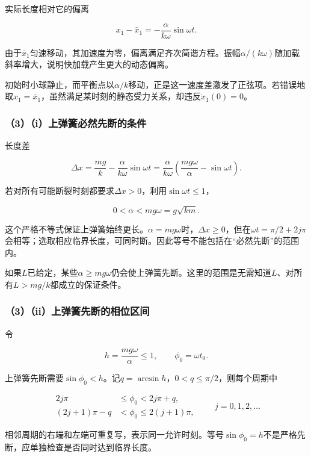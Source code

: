 \documentclass[12pt,a4paper,fontset=fandol]{ctexart}
\begin{document}
实际长度相对它的偏离

\[
x_1-\bar x_1=-\frac{\alpha}{k\omega}\sin\omega t.
\]

由于\(\bar x_1\)匀速移动，其加速度为零，偏离满足齐次简谐方程。振幅\(\alpha/(k\omega)\)随加载斜率增大，说明快加载产生更大的动态偏离。

初始时小球静止，而平衡点以\(\alpha/k\)移动，正是这一速度差激发了正弦项。若错误地取\(x_1=\bar x_1\)，虽然满足某时刻的静态受力关系，却违反\(\dot x_1(0)=0\)。

\subsubsection{（3）（i）上弹簧必然先断的条件}\label{iux4e0aux5f39ux7c27ux5fc5ux7136ux5148ux65adux7684ux6761ux4ef6}

长度差

\[
\Delta x=\frac{mg}k-\frac{\alpha}{k\omega}\sin\omega t
=\frac{\alpha}{k\omega}
\left(\frac{mg\omega}{\alpha}-\sin\omega t\right).
\]

若对所有可能断裂时刻都要求\(\Delta x>0\)，利用\(\sin\omega t\leq1\)，

\[
\boxed{0<\alpha<mg\omega=g\sqrt{km}}.
\]

这个严格不等式保证上弹簧始终更长。\(\alpha=mg\omega\)时，\(\Delta x\geq0\)，但在\(\omega t=\pi/2+2j\pi\)会相等；选取相应临界长度，可同时断。因此等号不能包括在``必然先断''的范围内。

如果\(L\)已给定，某些\(\alpha\geq mg\omega\)仍会使上弹簧先断。这里的范围是无需知道\(L\)、对所有\(L>mg/k\)都成立的保证条件。

\subsubsection{（3）（ii）上弹簧先断的相位区间}\label{iiux4e0aux5f39ux7c27ux5148ux65adux7684ux76f8ux4f4dux533aux95f4}

令

\[
h=\frac{mg\omega}{\alpha}\leq1,\qquad
\phi_0=\omega t_0.
\]

上弹簧先断需要\(\sin\phi_0<h\)。记\(q=\arcsin h\)，\(0<q\leq\pi/2\)，则每个周期中

\[
\boxed{
\begin{aligned}
2j\pi&\leq\phi_0<2j\pi+q,\\
(2j+1)\pi-q&<\phi_0\leq2(j+1)\pi,
\end{aligned}\qquad j=0,1,2,\ldots}
\]

相邻周期的右端和左端可重复写，表示同一允许时刻。等号\(\sin\phi_0=h\)不是严格先断，应单独检查是否同时达到临界长度。
\end{document}
